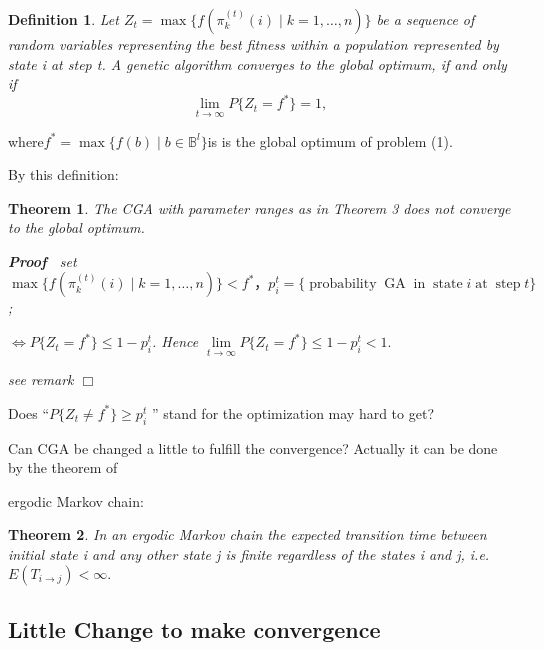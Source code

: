 \documentclass{article}
\newcommand{\tmop}[1]{\ensuremath{\operatorname{#1}}}
\newenvironment{proof}{\noindent\textbf{Proof\ }}{\hspace*{\fill}$\Box$\medskip}
\newtheorem{definition}{Definition}
{\theorembodyfont{\rmfamily}\newtheorem{example}{Example}}
\newtheorem{theorem}{Theorem}
\begin{document}
\begin{definition}
  Let $Z_t = \max \{ f (\pi_k^{(t)} (i) \mid k = 1, \ldots, n) \}$ be a
  sequence of random variables representing the best fitness within a
  population represented by state i at step t. A genetic algorithm converges
  to the global optimum, if and only if
  \begin{equation}
    \underset{t \rightarrow \infty}{\lim} P \{ Z_t = f^{\ast} \} = 1,
  \end{equation}
\end{definition}

where$f^{\ast} = \max \{ f (b) \mid b \in \mathbb{B}^l \} $is is the global
optimum of problem (1)\label{(1)}.

By this definition:

\begin{theorem}
  The CGA with parameter ranges as in Theorem 3 does not converge to the
  global optimum.
  
  \begin{proof}
    set $\max \{ f (\pi_k^{(t)} (i) \mid k = 1, \ldots, n) \} < f^{\ast}
    ，p^t_i = \{ \tmop{probability} \tmop{GA} \tmop{in} \tmop{state} i
    \tmop{at} \tmop{step} t \}$;
    
    $\Leftrightarrow P
    \{ Z_t = f^{\ast} \} \leqslant 1 - p^t_i$. Hence $\underset{t \rightarrow
    \infty}{\lim} P \{ Z_t = f^{\ast} \} \leqslant 1 - p^t_i < 1.$
    
    see remark
  \end{proof}
\end{theorem}

\begin{remark}
  Does ``$P \{ Z_t \neq f^{\ast} \} \geqslant p^t_i$ '' stand for the
  optimization may hard to get?
\end{remark}

Can CGA be changed a little to fulfill the convergence? Actually it can be
done by the theorem of

ergodic Markov chain:

\begin{theorem}
  In an ergodic Markov chain the expected transition time between initial
  state i and any other state j is finite regardless of the states i and j,
  i.e. $E (T_{i \rightarrow j}) < \infty .$
\end{theorem}

\subsection{Little Change to make convergence}
\end{document}
